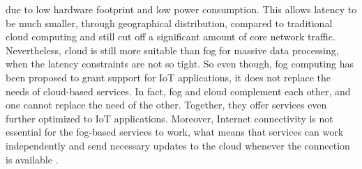 due to low hardware footprint and low power consumption. This allows latency to
be much smaller, through geographical distribution, compared to traditional
cloud computing and still cut off a significant amount of core network traffic.
Nevertheless, cloud is still more suitable than fog for massive data processing,
when the latency constraints are not so tight. So even though, fog computing has
been proposed to grant support for IoT applications, it does not replace the
needs of cloud-based services. In fact, fog and cloud complement each other, and
one cannot replace the need of the other. Together, they offer services even
further optimized to IoT applications. Moreover, Internet connectivity is not
essential for the fog-based services to work, what means that services can work
independently and send necessary updates to the cloud whenever the connection is
available \cite{yousefpour2018all}.

